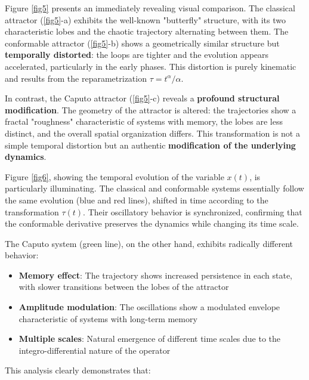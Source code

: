 \documentclass[preprint,12pt]{elsarticle}
\begin{document}
\begin{description}
\item Figure \ref{fig5} presents an immediately revealing visual comparison. The classical attractor (\ref{fig5}-a) exhibits the well-known "butterfly" structure, with its two characteristic lobes and the chaotic trajectory alternating between them. The conformable attractor (\ref{fig5}-b) shows a geometrically similar structure but \textbf{temporally distorted}: the loops are tighter and the evolution appears accelerated, particularly in the early phases. This distortion is purely kinematic and results from the reparametrization $\tau = t^\alpha/\alpha$.

In contrast, the Caputo attractor (\ref{fig5}-c) reveals a \textbf{profound structural modification}. The geometry of the attractor is altered: the trajectories show a fractal "roughness" characteristic of systems with memory, the lobes are less distinct, and the overall spatial organization differs. This transformation is not a simple temporal distortion but an authentic \textbf{modification of the underlying dynamics}.


\item Figure \ref{fig6}, showing the temporal evolution of the variable $x(t)$, is particularly illuminating. The classical and conformable systems essentially follow the same evolution (blue and red lines), shifted in time according to the transformation $\tau(t)$. Their oscillatory behavior is synchronized, confirming that the conformable derivative preserves the dynamics while changing its time scale.

The Caputo system (green line), on the other hand, exhibits radically different behavior:
\begin{itemize}
\item[•] \textbf{Memory effect}: The trajectory shows increased persistence in each state, with slower transitions between the lobes of the attractor
\item[•] \textbf{Amplitude modulation}: The oscillations show a modulated envelope characteristic of systems with long-term memory
\item[•] \textbf{Multiple scales}: Natural emergence of different time scales due to the integro-differential nature of the operator
\end{itemize}

\end{description}


This analysis clearly demonstrates that:
\end{document}
